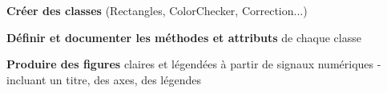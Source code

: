\item \textbf{Créer des classes} (Rectangles, ColorChecker, Correction...)
\item \textbf{Définir et documenter les méthodes et attributs} de chaque classe
\item \textbf{Produire des figures} claires et légendées à partir de signaux numériques - incluant un titre, des axes, des légendes
